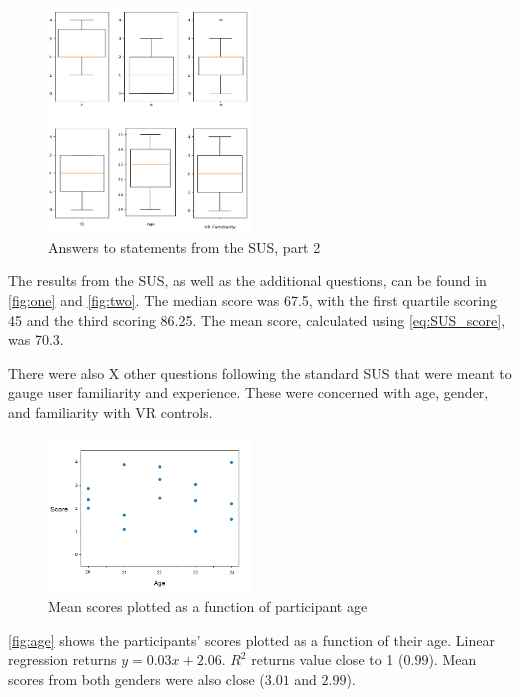 \begin{figure}
\centering
\includegraphics[width=0.48\textwidth]{Page2.png}
\caption{Answers to statements from the SUS, part 2}
\label{fig:two}
\end{figure}

The results from the SUS, as well as the additional questions, can be found in \autoref{fig:one} and \autoref{fig:two}.
The median score was 67.5, with the first quartile scoring 45 and the third scoring 86.25. The mean score, calculated using \autoref{eq:SUS_score}, was 70.3. %

There were also X other questions following the standard SUS that were meant to gauge user familiarity and experience. These were concerned with age, gender, and familiarity with VR controls. 

\begin{figure}
	\centering
	\includegraphics[width = 0.48\textwidth]{age.png}
	\caption{Mean scores plotted as a function of participant age}
	\label{fig:age}
\end{figure}

\autoref{fig:age} shows the participants' scores plotted as a function of their age. Linear regression returns $y = 0.03x + 2.06$. $R^2$ returns value close to 1 ($0.99$). Mean scores from both genders were also close ($ 3.01 $ and $ 2.99 $). 


